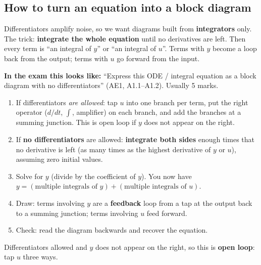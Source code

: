 \subsection{How to turn an equation into a block diagram}\label{sec:bd}\label{ss:1-3}
\begin{plainbox}
Differentiators amplify noise, so we want diagrams built from \textbf{integrators} only.
The trick: \textbf{integrate the whole equation} until no derivatives are left. Then every term is ``an integral of $y$'' or
``an integral of $u$''. Terms with $y$ become a loop back from the output; terms with $u$ go forward from the input.
\par\smallskip\textbf{In the exam this looks like:} ``Express this ODE / integral equation as a block diagram with no differentiators'' (AE1, A1.1--A1.2). Usually 5 marks.
\end{plainbox}
\begin{methodbox}
\begin{enumerate}
\item If differentiators \emph{are allowed}: tap $u$ into one branch per term, put the right operator ($d/dt$, $\int$, amplifier) on each branch, and add the branches at a summing junction. This is open loop if $y$ does not appear on the right.
\item If \textbf{no differentiators} are allowed: \textbf{integrate both sides} enough times that no derivative is left
(as many times as the highest derivative of $y$ or $u$), assuming zero initial values.
\item Solve for $y$ (divide by the coefficient of $y$). You now have $y=(\text{multiple integrals of }y)+(\text{multiple integrals of }u)$.
\item Draw: terms involving $y$ are a \textbf{feedback} loop from a tap at the output back to a summing junction; terms involving $u$ feed forward.
\item Check: read the diagram backwards and recover the equation.
\end{enumerate}
\end{methodbox}

\begin{workbox}[title={Worked example (AE1, A1.1(i)): $y=4\dfrac{d^2u}{dt^2}+3\displaystyle\int u+6u$}]
Differentiators allowed and $y$ does not appear on the right, so this is \textbf{open loop}: tap $u$ three ways.
\begin{center}
\end{center}
\end{workbox}

